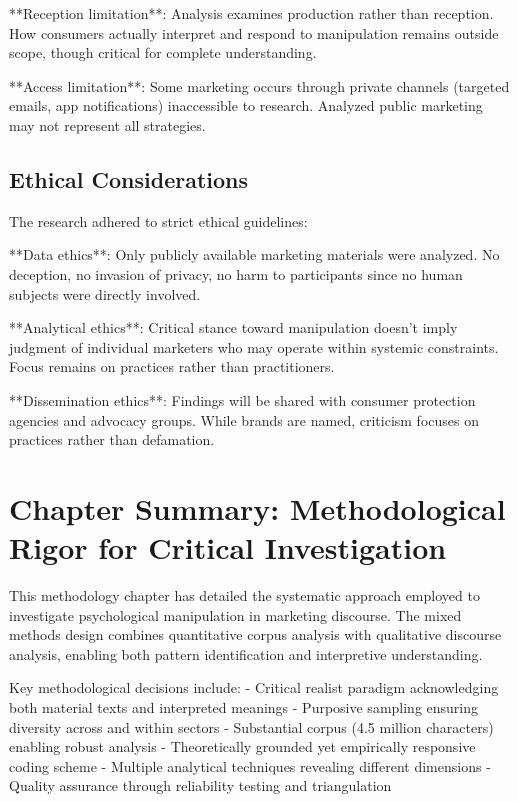 **Reception limitation**: Analysis examines production rather than reception. How consumers actually interpret and respond to manipulation remains outside scope, though critical for complete understanding.

**Access limitation**: Some marketing occurs through private channels (targeted emails, app notifications) inaccessible to research. Analyzed public marketing may not represent all strategies.

\subsection{Ethical Considerations}

The research adhered to strict ethical guidelines:

**Data ethics**: Only publicly available marketing materials were analyzed. No deception, no invasion of privacy, no harm to participants since no human subjects were directly involved.

**Analytical ethics**: Critical stance toward manipulation doesn't imply judgment of individual marketers who may operate within systemic constraints. Focus remains on practices rather than practitioners.

**Dissemination ethics**: Findings will be shared with consumer protection agencies and advocacy groups. While brands are named, criticism focuses on practices rather than defamation.

\section{Chapter Summary: Methodological Rigor for Critical Investigation}
\label{sec:method_summary}

This methodology chapter has detailed the systematic approach employed to investigate psychological manipulation in marketing discourse. The mixed methods design combines quantitative corpus analysis with qualitative discourse analysis, enabling both pattern identification and interpretive understanding.

Key methodological decisions include:
- Critical realist paradigm acknowledging both material texts and interpreted meanings
- Purposive sampling ensuring diversity across and within sectors
- Substantial corpus (4.5 million characters) enabling robust analysis
- Theoretically grounded yet empirically responsive coding scheme
- Multiple analytical techniques revealing different dimensions
- Quality assurance through reliability testing and triangulation

